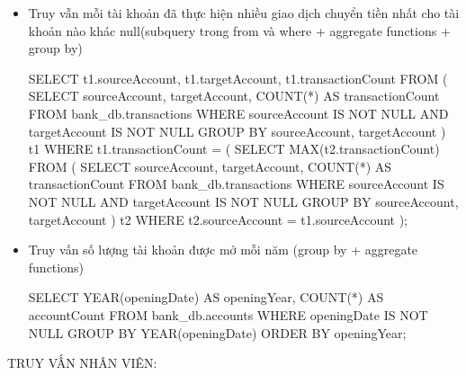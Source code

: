 \begin{itemize}
    \item Truy vẫn mỗi tài khoản đã thực hiện nhiều giao dịch chuyển tiền nhất cho tài khoản nào khác null(subquery trong from và where + aggregate functions + group by)
    \begin{MySQLCode}
    SELECT 
        t1.sourceAccount, 
        t1.targetAccount, 
        t1.transactionCount
    FROM (
        SELECT 
            sourceAccount, 
            targetAccount, 
            COUNT(*) AS transactionCount
        FROM 
            bank_db.transactions
        WHERE 
            sourceAccount IS NOT NULL 
            AND targetAccount IS NOT NULL
        GROUP BY 
            sourceAccount, targetAccount
    ) t1
    WHERE 
        t1.transactionCount = (
            SELECT 
                MAX(t2.transactionCount)
            FROM (
                SELECT 
                    sourceAccount, 
                    targetAccount, 
                    COUNT(*) AS transactionCount
                FROM 
                    bank_db.transactions
                WHERE 
                    sourceAccount IS NOT NULL 
                    AND targetAccount IS NOT NULL
                GROUP BY 
                    sourceAccount, targetAccount
            ) t2
            WHERE 
                t2.sourceAccount = t1.sourceAccount
        );
    \end{MySQLCode}

    \item Truy vấn số lượng tài khoản được mở mỗi năm (group by + aggregate functions)
    \begin{MySQLCode}
    SELECT 
        YEAR(openingDate) AS openingYear,
        COUNT(*) AS accountCount
    FROM 
        bank_db.accounts
    WHERE 
        openingDate IS NOT NULL
    GROUP BY 
        YEAR(openingDate)
    ORDER BY 
        openingYear;
    \end{MySQLCode}

\end{itemize}
TRUY VẤN NHÂN VIÊN:
